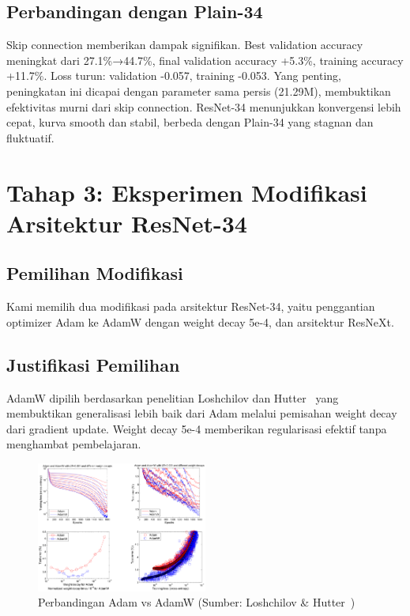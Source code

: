 \documentclass[11pt,a4paper]{article}
\begin{document}
\subsection{Perbandingan dengan Plain-34}

Skip connection memberikan dampak signifikan. Best validation accuracy meningkat dari 27.1\%→44.7\%, final validation accuracy +5.3\%, training accuracy +11.7\%. Loss turun: validation -0.057, training -0.053. Yang penting, peningkatan ini dicapai dengan parameter sama persis (21.29M), membuktikan efektivitas murni dari skip connection. ResNet-34 menunjukkan konvergensi lebih cepat, kurva smooth dan stabil, berbeda dengan Plain-34 yang stagnan dan fluktuatif.

\section{Tahap 3: Eksperimen Modifikasi Arsitektur ResNet-34}
\subsection{Pemilihan Modifikasi}
Kami memilih dua modifikasi pada arsitektur ResNet-34, yaitu penggantian optimizer Adam ke AdamW dengan weight decay 5e-4, dan arsitektur ResNeXt.

\subsection{Justifikasi Pemilihan}
AdamW dipilih berdasarkan penelitian Loshchilov dan Hutter~\cite{loshchilov2017decoupled} yang membuktikan generalisasi lebih baik dari Adam melalui pemisahan weight decay dari gradient update. Weight decay 5e-4 memberikan regularisasi efektif tanpa menghambat pembelajaran.

\begin{figure}[h]
\centering
\includegraphics[width=0.5\textwidth]{Figure/tahap-3-adamw-comparison.png}
\caption{Perbandingan Adam vs AdamW (Sumber: Loshchilov \& Hutter~\cite{loshchilov2017decoupled})}
\label{fig:adamw}
\end{figure}
\end{document}
